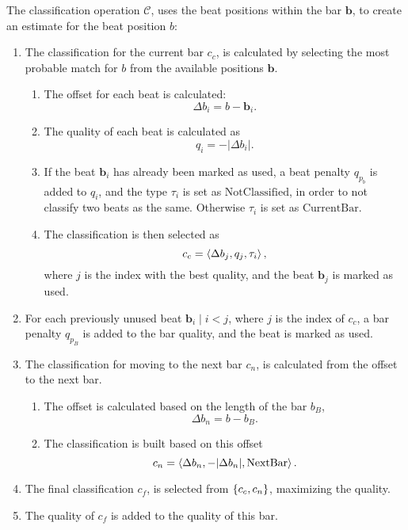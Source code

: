 The classification operation $\mathcal{C}$,
uses the beat positions within the bar $\mathbf{b}$,
to create an estimate for the beat position $b$:
\begin{enumerate}
\item The classification for the current bar $c_c$,
is calculated by selecting the most probable match for $b$
from the available positions $\mathbf{b}$.
\begin{enumerate}
\item The offset for each beat is calculated:
\begin{equation}
\Delta b_i = b - \mathbf{b}_i.
\end{equation}

\item The quality of each beat is calculated as
\begin{equation}
q_i = -\vert \Delta b_i \vert.
\end{equation}

\item If the beat $\mathbf{b}_i$ has already been marked as used,
a beat penalty $q_{p_b}$ is added to $q_i$,
and the type $\tau_i$ is set as $\mathrm{NotClassified}$,
in order to not classify two beats as the same.
Otherwise $\tau_i$ is set as $\mathrm{CurrentBar}$.

\item The classification is then selected as
\begin{equation}
c_c = \left \langle \Delta b_j, q_j, \tau_i \right \rangle ,
\end{equation}
where $j$ is the index with the best quality,
and the beat $\mathbf{b}_j$ is marked as used.

\end{enumerate}

\item For each previously unused beat $\mathbf{b}_i \mid i < j$,
where $j$ is the index of $c_c$,
a bar penalty $q_{p_B}$ is added to the bar quality,
and the beat is marked as used.

\item The classification for moving to the next bar $c_n$,
is calculated from the offset to the next bar.
\begin{enumerate}
\item The offset is calculated based on the length of the bar $b_B$,
\begin{equation}
\Delta b_n = b - b_B.
\end{equation}

\item The classification is built based on this offset
\begin{equation}
c_n = \left \langle \Delta b_n, -\vert \Delta b_n \vert, \mathrm{NextBar} \right \rangle .
\end{equation}

\end{enumerate}

\item The final classification $c_f$,
is selected from $ \left \lbrace c_c, c_n \right \rbrace  $,
maximizing the quality.

\item The quality of $c_f$ is added to the quality of this bar.

\end{enumerate}
